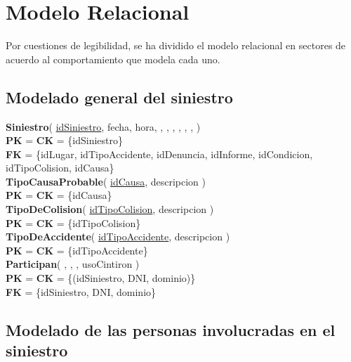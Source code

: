\section{Modelo Relacional}
\small

Por cuestiones de legibilidad, se ha dividido el modelo relacional en sectores
    de acuerdo al comportamiento que modela cada uno.

\subsection{Modelado general del siniestro}

\textbf{Siniestro}(
    \uline{idSiniestro},
    fecha,
    hora,
    ,
    ,
    ,
    ,
    ,
    ,
)\\
\textbf{PK} = \textbf{CK} = \{idSiniestro\}\\
\textbf{FK} = \{idLugar, idTipoAccidente, idDenuncia, idInforme, idCondicion, idTipoColision, idCausa\}\\

\textbf{TipoCausaProbable}(
    \uline{idCausa},
    descripcion
)\\
\textbf{PK} = \textbf{CK} = \{idCausa\}\\

\textbf{TipoDeColision}(
    \uline{idTipoColision},
    descripcion
)\\
\textbf{PK} = \textbf{CK} = \{idTipoColision\}\\

\textbf{TipoDeAccidente}(
    \uline{idTipoAccidente},
    descripcion
)\\
\textbf{PK} = \textbf{CK} = \{idTipoAccidente\}\\


\textbf{Participan}(
    ,
    ,
    ,
    usoCintiron
)\\
\textbf{PK} = \textbf{CK} = \{(idSiniestro, DNI, dominio)\}\\
\textbf{FK} = \{idSiniestro, DNI, dominio\}\\


\subsection{Modelado de las personas involucradas en el siniestro}

